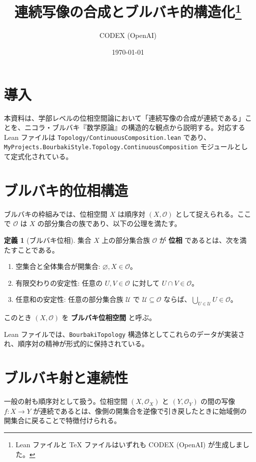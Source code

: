 \documentclass[a4paper]{ltjsarticle}
\title{連続写像の合成とブルバキ的構造化\thanks{Lean ファイルと TeX ファイルはいずれも CODEX (OpenAI) が生成しました。}}
\author{CODEX (OpenAI)}
\date{\today}
\theoremstyle{definition}
\newtheorem{definition}{定義}
\theoremstyle{plain}
\begin{document}
\maketitle

\section*{導入}
本資料は、学部レベルの位相空間論において「連続写像の合成が連続である」ことを、ニコラ・ブルバキ『数学原論』の構造的な観点から説明する。対応する Lean ファイルは \texttt{Topology/ContinuousComposition.lean} であり、\texttt{MyProjects.BourbakiStyle.Topology.ContinuousComposition} モジュールとして定式化されている。

\section{ブルバキ的位相構造}
ブルバキの枠組みでは、位相空間 $X$ は順序対 $(X, \mathcal{O})$ として捉えられる。ここで $\mathcal{O}$ は $X$ の部分集合の族であり、以下の公理を満たす。

\begin{definition}[ブルバキ位相]
集合 $X$ 上の部分集合族 $\mathcal{O}$ が \textbf{位相} であるとは、次を満たすことである。
\begin{enumerate}[label=\arabic*)]
  \item 空集合と全体集合が開集合: $\varnothing, X \in \mathcal{O}$。
  \item 有限交わりの安定性: 任意の $U,V \in \mathcal{O}$ に対して $U \cap V \in \mathcal{O}$。
  \item 任意和の安定性: 任意の部分集合族 $\mathscr{U}$ で $\mathscr{U} \subseteq \mathcal{O}$ ならば、$\bigcup_{U \in \mathscr{U}} U \in \mathcal{O}$。
\end{enumerate}
このとき $(X,\mathcal{O})$ を 
\textbf{ブルバキ位相空間} と呼ぶ。
\end{definition}

Lean ファイルでは、\texttt{BourbakiTopology} 構造体としてこれらのデータが実装され、順序対の精神が形式的に保持されている。

\section{ブルバキ射と連続性}
一般の射も順序対として扱う。位相空間 $(X,\mathcal{O}_X)$ と $(Y,\mathcal{O}_Y)$ の間の写像 $f : X \to Y$ が連続であるとは、像側の開集合を逆像で引き戻したときに始域側の開集合に戻ることで特徴付けられる。
\end{document}
